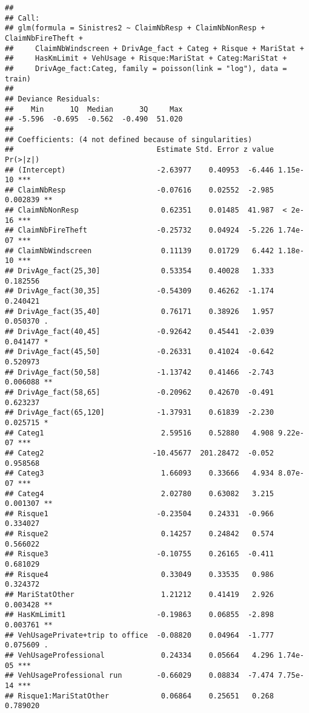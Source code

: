 \documentclass[
]{article}
\begin{document}
\begin{verbatim}
## 
## Call:
## glm(formula = Sinistres2 ~ ClaimNbResp + ClaimNbNonResp + ClaimNbFireTheft + 
##     ClaimNbWindscreen + DrivAge_fact + Categ + Risque + MariStat + 
##     HasKmLimit + VehUsage + Risque:MariStat + Categ:MariStat + 
##     DrivAge_fact:Categ, family = poisson(link = "log"), data = train)
## 
## Deviance Residuals: 
##    Min      1Q  Median      3Q     Max  
## -5.596  -0.695  -0.562  -0.490  51.020  
## 
## Coefficients: (4 not defined because of singularities)
##                                 Estimate Std. Error z value Pr(>|z|)    
## (Intercept)                     -2.63977    0.40953  -6.446 1.15e-10 ***
## ClaimNbResp                     -0.07616    0.02552  -2.985 0.002839 ** 
## ClaimNbNonResp                   0.62351    0.01485  41.987  < 2e-16 ***
## ClaimNbFireTheft                -0.25732    0.04924  -5.226 1.74e-07 ***
## ClaimNbWindscreen                0.11139    0.01729   6.442 1.18e-10 ***
## DrivAge_fact(25,30]              0.53354    0.40028   1.333 0.182556    
## DrivAge_fact(30,35]             -0.54309    0.46262  -1.174 0.240421    
## DrivAge_fact(35,40]              0.76171    0.38926   1.957 0.050370 .  
## DrivAge_fact(40,45]             -0.92642    0.45441  -2.039 0.041477 *  
## DrivAge_fact(45,50]             -0.26331    0.41024  -0.642 0.520973    
## DrivAge_fact(50,58]             -1.13742    0.41466  -2.743 0.006088 ** 
## DrivAge_fact(58,65]             -0.20962    0.42670  -0.491 0.623237    
## DrivAge_fact(65,120]            -1.37931    0.61839  -2.230 0.025715 *  
## Categ1                           2.59516    0.52880   4.908 9.22e-07 ***
## Categ2                         -10.45677  201.28472  -0.052 0.958568    
## Categ3                           1.66093    0.33666   4.934 8.07e-07 ***
## Categ4                           2.02780    0.63082   3.215 0.001307 ** 
## Risque1                         -0.23504    0.24331  -0.966 0.334027    
## Risque2                          0.14257    0.24842   0.574 0.566022    
## Risque3                         -0.10755    0.26165  -0.411 0.681029    
## Risque4                          0.33049    0.33535   0.986 0.324372    
## MariStatOther                    1.21212    0.41419   2.926 0.003428 ** 
## HasKmLimit1                     -0.19863    0.06855  -2.898 0.003761 ** 
## VehUsagePrivate+trip to office  -0.08820    0.04964  -1.777 0.075609 .  
## VehUsageProfessional             0.24334    0.05664   4.296 1.74e-05 ***
## VehUsageProfessional run        -0.66029    0.08834  -7.474 7.75e-14 ***
## Risque1:MariStatOther            0.06864    0.25651   0.268 0.789020    

\end{verbatim}
\end{document}
